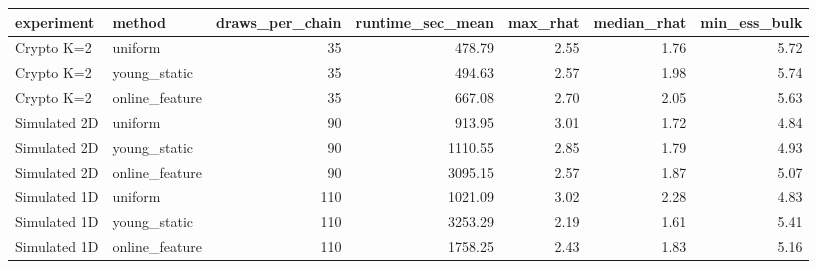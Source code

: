 \begin{tabular}{llrrrrr}
\toprule
experiment & method & draws\_per\_chain & runtime\_sec\_mean & max\_rhat & median\_rhat & min\_ess\_bulk \\
\midrule
Crypto K=2 & uniform & 35 & 478.79 & 2.55 & 1.76 & 5.72 \\
Crypto K=2 & young\_static & 35 & 494.63 & 2.57 & 1.98 & 5.74 \\
Crypto K=2 & online\_feature & 35 & 667.08 & 2.70 & 2.05 & 5.63 \\
Simulated 2D & uniform & 90 & 913.95 & 3.01 & 1.72 & 4.84 \\
Simulated 2D & young\_static & 90 & 1110.55 & 2.85 & 1.79 & 4.93 \\
Simulated 2D & online\_feature & 90 & 3095.15 & 2.57 & 1.87 & 5.07 \\
Simulated 1D & uniform & 110 & 1021.09 & 3.02 & 2.28 & 4.83 \\
Simulated 1D & young\_static & 110 & 3253.29 & 2.19 & 1.61 & 5.41 \\
Simulated 1D & online\_feature & 110 & 1758.25 & 2.43 & 1.83 & 5.16 \\
\bottomrule
\end{tabular}
